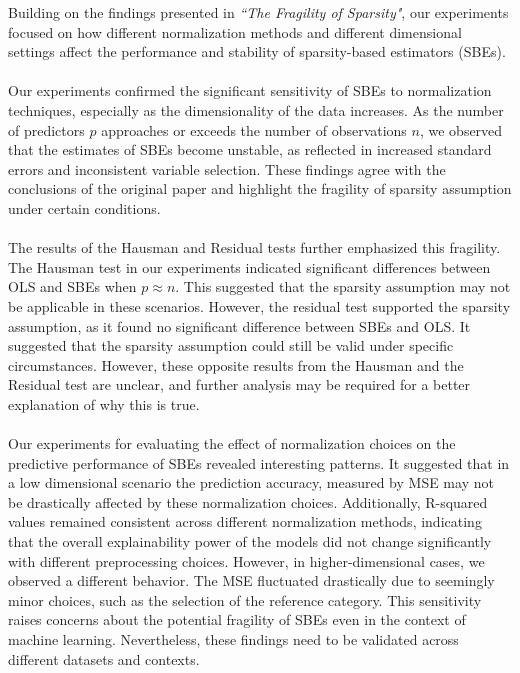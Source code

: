 Building on the findings presented in \textit{``The Fragility of Sparsity"}, our experiments focused on how different normalization methods and different dimensional settings affect the performance and stability of sparsity-based estimators (SBEs). \\
\\
Our experiments confirmed the significant sensitivity of SBEs to normalization techniques, especially as the dimensionality of the data increases. As the number of predictors $p$ approaches or exceeds the number of observations $n$, we observed that the estimates of SBEs become unstable, as reflected in increased standard errors and inconsistent variable selection. These findings agree with the conclusions of the original paper and highlight the fragility of sparsity assumption under certain conditions. 
\\
\\
The results of the Hausman and Residual tests further emphasized this fragility. The Hausman test in our experiments indicated significant differences between OLS and SBEs when $p \approx n$. This suggested that the sparsity assumption may not be applicable in these scenarios. However, the residual test supported the sparsity assumption, as it found no significant difference between SBEs and OLS. It suggested that the sparsity assumption could still be valid under specific circumstances. However, these opposite results from the Hausman and the Residual test are unclear, and further analysis may be required for a better explanation of why this is true. \\
\\
Our experiments for evaluating the effect of normalization choices on the predictive performance of SBEs revealed interesting patterns. It suggested that in a low dimensional scenario the prediction accuracy, measured by MSE may not be drastically affected by these normalization choices. Additionally, R-squared values remained consistent across different normalization methods, indicating that the overall explainability power of the models did not change significantly with different preprocessing choices. However, in higher-dimensional cases, we observed a different behavior. The MSE fluctuated drastically due to seemingly minor choices, such as the selection of the reference category. This sensitivity raises concerns about the potential fragility of SBEs even in the context of machine learning. Nevertheless, these findings need to be validated across different datasets and contexts.\\
